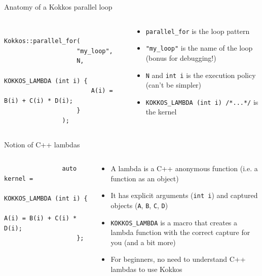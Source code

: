 \documentclass[aspectratio=169]{beamer}
\begin{document}
\begin{frame}[fragile]{Anatomy of a Kokkos parallel loop}
    \begin{columns}
        \begin{column}{0.5\linewidth}
            \begin{verbatim}
                Kokkos::parallel_for(
                    "my_loop",
                    N,
                    KOKKOS_LAMBDA (int i) {
                        A(i) = B(i) + C(i) * D(i);
                    }
                );
            \end{verbatim}
        \end{column}
        \begin{column}{0.5\linewidth}
            \begin{itemize}
                \item \texttt{parallel_for} is the loop pattern
                \item \texttt{"my_loop"} is the name of the loop (bonus for debugging!)
                \item \texttt{N} and \texttt{int i} is the execution policy (can't be simpler)
                \item \texttt{KOKKOS_LAMBDA (int i) {/*...*/}} is the kernel
            \end{itemize}
        \end{column}
    \end{columns}
\end{frame}


\begin{frame}[fragile]{Notion of C++ lambdas}
    \begin{columns}
        \begin{column}{0.5\linewidth}
            \begin{verbatim}
                auto kernel =
                    KOKKOS_LAMBDA (int i) {
                        A(i) = B(i) + C(i) * D(i);
                    };
            \end{verbatim}
        \end{column}
        \begin{column}{0.5\linewidth}
            \begin{itemize}
                \item A lambda is a C++ anonymous function (i.e. a function as an object)
                \item It has explicit arguments (\texttt{int i}) and captured objects (\texttt{A}, \texttt{B}, \texttt{C}, \texttt{D})
                \item \texttt{KOKKOS\_LAMBDA} is a macro that creates a lambda function with the correct capture for you (and a bit more)
                \item For beginners, no need to understand C++ lambdas to use Kokkos
            \end{itemize}
        \end{column}
    \end{columns}
\end{frame}
\end{document}
